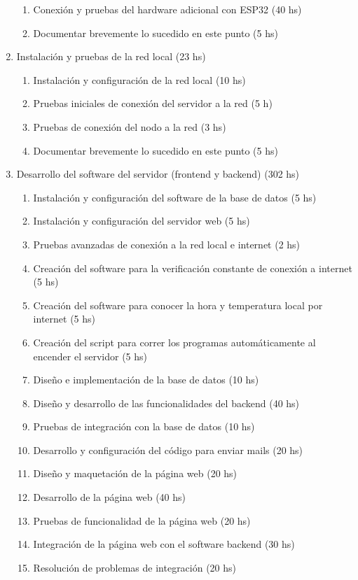 \documentclass[
11pt, %
]{charter}
\begin{document}
\begin{enumerate}
\begin{enumerate}
		\item Conexión y pruebas del hardware adicional con ESP32 (40 hs)
		\item Documentar brevemente lo sucedido en este punto (5 hs)
	\end{enumerate}
\item Instalación y pruebas de la red local (23 hs)
	\begin{enumerate}
		\item Instalación y configuración de la red local (10 hs)
		\item Pruebas iniciales de conexión del servidor a la red (5 h)
		\item Pruebas de conexión del nodo a la red (3 hs)
		\item Documentar brevemente lo sucedido en este punto (5 hs)
	\end{enumerate}
\item Desarrollo del software del servidor (frontend y backend) (302 hs)
	\begin{enumerate}
		\item Instalación y configuración del software de la base de datos (5 hs)
		\item Instalación y configuración del servidor web (5 hs)
		\item Pruebas avanzadas de conexión a la red local e internet (2 hs)
		\item Creación del software para la verificación constante de conexión a internet (5 hs)
		\item Creación del software para conocer la hora y temperatura local por internet (5 hs)
		\item Creación del script para correr los programas automáticamente al encender el servidor (5 hs)
		\item Diseño e implementación de la base de datos (10 hs)
		\item Diseño y desarrollo de las funcionalidades del backend (40 hs)
		\item Pruebas de integración con la base de datos (10 hs)
		\item Desarrollo y configuración del código para enviar mails (20 hs)
		\item Diseño y maquetación de la página web (20 hs)
		\item Desarrollo de la página web (40 hs)
		\item Pruebas de funcionalidad de la página web (20 hs)
		\item Integración de la página web con el software backend (30 hs)
		\item Resolución de problemas de integración (20 hs)

\end{enumerate}
\end{enumerate}
\end{document}
